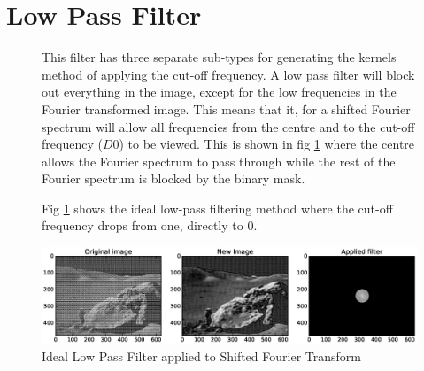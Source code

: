 \section{Low Pass Filter}
\begin{figure}[h]
\begin{minipage}{0.57\linewidth}
	This filter has three separate sub-types for generating the kernels method of 
	applying the cut-off frequency.  A low pass filter will block out everything
	in the image, except for the low frequencies in the Fourier transformed image.
	This means that it, for a shifted Fourier spectrum will allow all frequencies
	from the centre and to the cut-off frequency ($D0$) to be viewed.  This is
	shown in fig \ref{fig:lp_ideal} where the centre allows the Fourier spectrum
	to pass through while the rest of the Fourier spectrum is blocked by the
	binary mask.

	Fig \ref{fig:lp_ideal} shows the ideal low-pass filtering method where the
	cut-off frequency drops from one, directly to 0.
\end{minipage}\hfill
\begin{minipage}{0.4\linewidth}
	\centering
	\includegraphics[width=1\linewidth,clip,trim={650 110 75 110}]{pics/moon_lp_ideal}
	\caption{Ideal Low Pass Filter applied to Shifted Fourier Transform}
	\label{fig:lp_ideal}
\end{minipage}
\end{figure}

\pagebreak
